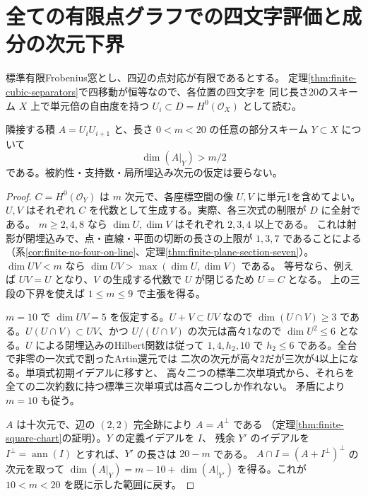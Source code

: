 \section{全ての有限点グラフでの四文字評価と成分の次元下界}
\label{sec:finite-four-slot-evaluations}
標準有限Frobenius窓とし、四辺の点対応が有限であるとする。
定理\ref{thm:finite-cubic-separators}で四移動が恒等なので、各位置の四文字を
同じ長さ20のスキーム $X$ 上で単元倍の自由度を持つ $U_i\subset D=H^0(\mathcal O_X)$ として読む。
\begin{lemma}\label{lem:finite-adjacent-strict-half}
隣接する積 $A=U_iU_{i+1}$ と、長さ $0<m<20$ の任意の部分スキーム $Y\subset X$ について
\[
                     \dim(A|_Y)>m/2
\]
である。被約性・支持数・局所埋込み次元の仮定は要らない。
\end{lemma}
\begin{proof}
$C=H^0(\mathcal O_Y)$ は $m$ 次元で、各座標空間の像 $U,V$ に単元1を含めてよい。
$U,V$ はそれぞれ $C$ を代数として生成する。実際、各三次式の制限が $D$ に全射である。
$m\ge2,4,8$ なら $\dim U,\dim V$ はそれぞれ $2,3,4$ 以上である。
これは射影が閉埋込みで、点・直線・平面の切断の長さの上限が $1,3,7$ であることによる
（系\ref{cor:finite-no-four-on-line}、定理\ref{thm:finite-plane-section-seven}）。
$\dim UV<m$ なら $\dim UV>\max(\dim U,\dim V)$ である。
等号なら、例えば $UV=U$ となり、$V$ の生成する代数で $U$ が閉じるため $U=C$ となる。
上の三段の下界を使えば $1\le m\le9$ で主張を得る。

$m=10$ で $\dim UV=5$ を仮定する。$U+V\subset UV$ なので
$\dim(U\cap V)\ge3$ である。$U(U\cap V)\subset UV$、かつ $U/(U\cap V)$ の次元は高々1なので
$\dim U^2\le6$ となる。$U$ による閉埋込みのHilbert関数は従って
$1,4,h_2,10$ で $h_2\le6$ である。全台で非零の一次式で割ったArtin還元では
二次の次元が高々2だが三次が4以上になる。単項式初期イデアルに移すと、
高々二つの標準二次単項式から、それらを全ての二次約数に持つ標準三次単項式は高々二つしか作れない。
矛盾により $m=10$ も従う。

$A$ は十次元で、辺の $(2,2)$ 完全跡により $A=A^\perp$ である
（定理\ref{thm:finite-square-chart}の証明）。$Y$ の定義イデアルを $I$、
残余 $Y'$ のイデアルを $I^\perp=\operatorname{ann}(I)$ とすれば、$Y'$ の長さは $20-m$ である。
$A\cap I=(A+I^\perp)^\perp$ の次元を取って
$\dim(A|_Y)=m-10+\dim(A|_{Y'})$ を得る。これが $10<m<20$ を既に示した範囲に戻す。
\end{proof}

